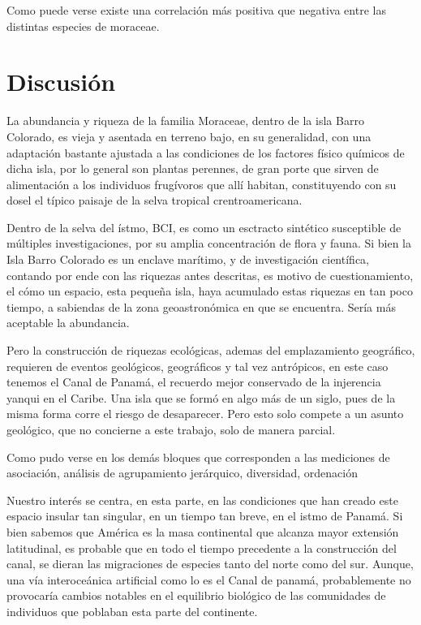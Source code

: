 \documentclass[11pt,]{article}
\begin{document}
Como puede verse existe una correlación más positiva que negativa entre
las distintas especies de moraceae.

\section{Discusión}\label{discusiuxf3n}

La abundancia y riqueza de la familia Moraceae, dentro de la isla Barro
Colorado, es vieja y asentada en terreno bajo, en su generalidad, con
una adaptación bastante ajustada a las condiciones de los factores
físico químicos de dicha isla, por lo general son plantas perennes, de
gran porte que sirven de alimentación a los individuos frugívoros que
allí habitan, constituyendo con su dosel el típico paisaje de la selva
tropical crentroamericana.

Dentro de la selva del ístmo, BCI, es como un esctracto sintético
susceptible de múltiples investigaciones, por su amplia concentración de
flora y fauna. Si bien la Isla Barro Colorado es un enclave marítimo, y
de investigación científica, contando por ende con las riquezas antes
descritas, es motivo de cuestionamiento, el cómo un espacio, esta
pequeña isla, haya acumulado estas riquezas en tan poco tiempo, a
sabiendas de la zona geoastronómica en que se encuentra. Sería más
aceptable la abundancia.

Pero la construcción de riquezas ecológicas, ademas del emplazamiento
geográfico, requieren de eventos geológicos, geográficos y tal vez
antrópicos, en este caso tenemos el Canal de Panamá, el recuerdo mejor
conservado de la injerencia yanqui en el Caribe. Una isla que se formó
en algo más de un siglo, pues de la misma forma corre el riesgo de
desaparecer. Pero esto solo compete a un asunto geológico, que no
concierne a este trabajo, solo de manera parcial.

Como pudo verse en los demás bloques que corresponden a las mediciones
de asociación, análisis de agrupamiento jerárquico, diversidad,
ordenación

Nuestro interés se centra, en esta parte, en las condiciones que han
creado este espacio insular tan singular, en un tiempo tan breve, en el
istmo de Panamá. Si bien sabemos que América es la masa continental que
alcanza mayor extensión latitudinal, es probable que en todo el tiempo
precedente a la construcción del canal, se dieran las migraciones de
especies tanto del norte como del sur. Aunque, una vía interoceánica
artificial como lo es el Canal de panamá, probablemente no provocaría
cambios notables en el equilibrio biológico de las comunidades de
individuos que poblaban esta parte del continente.
\end{document}
